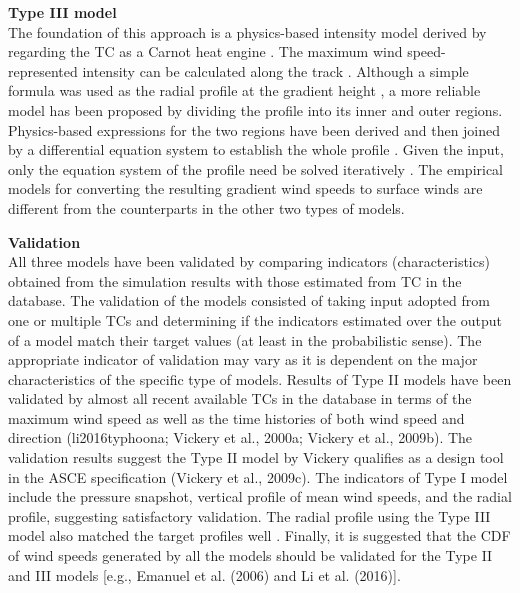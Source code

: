 \noindent\textbf{Type III model} \\The foundation of this approach is a physics-based intensity model derived by regarding the TC as a Carnot heat engine \citep{emanuel2004tropical,emanuel1988maximum}. The maximum wind speed-represented intensity can be calculated along the track \citep{emanuel2011selfstratification}. Although a simple formula was used as the radial profile at the gradient height \citep{emanuel2006statistical,lin2012hurricane}, a more reliable model has been proposed by dividing the profile into its inner and outer regions. Physics-based expressions for the two regions have been derived and then joined by a differential equation system to establish the whole profile \citep{emanuel2004tropical,emanuel2011selfstratificationa}. Given the input, only the equation system of the profile need be solved iteratively \citep{chavas2016model,chavas2015model} . The empirical models for converting the resulting gradient wind speeds to surface winds are different from the counterparts in the other two types of models. 
\newline

\noindent\textbf{Validation} \\All three models have been validated by comparing indicators (characteristics) obtained from the simulation results with those estimated from TC in the database. The validation of the models consisted of taking input adopted from one or multiple TCs and determining if the indicators estimated over the output of a model match their target values (at least in the probabilistic sense). The appropriate indicator of validation may vary as it is dependent on the major characteristics of the specific type of models. Results of Type II models have been validated by almost all recent available TCs in the database in terms of the maximum wind speed as well as the time histories of both wind speed and direction (li2016typhoona; Vickery et al., 2000a; Vickery et al., 2009b). The validation results suggest the Type II model by Vickery qualifies as a design tool in the ASCE specification (Vickery et al., 2009c). The indicators of Type I model include the pressure snapshot, vertical profile of mean wind speeds, and the radial profile, suggesting satisfactory validation. The radial profile using the Type III model also matched the target profiles well \citep{chavas2015model,emanuel2004tropical,emanuel2006statistical}. Finally, it is suggested that the CDF of wind speeds generated by all the models should be validated for the Type II and III models [e.g., Emanuel et al. (2006) and Li et al. (2016)]. 
\newline

